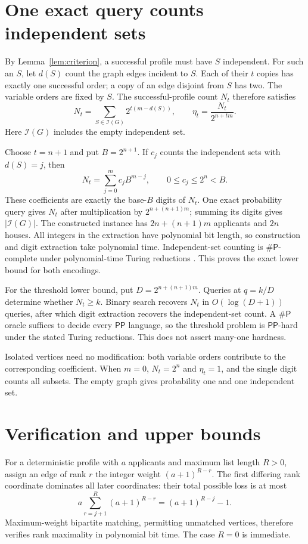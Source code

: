 \documentclass[10pt]{article}
\newcommand{\IS}{\mathcal I}
\newcommand{\PP}{\mathsf{PP}}
\newcommand{\sharpP}{\mathsf{\#P}}
\begin{document}
\section*{One exact query counts independent sets}
By Lemma~\ref{lem:criterion}, a successful profile must have $S$ independent.
For such an $S$, let $d(S)$ count the graph edges incident to $S$.
Each of their $t$ copies has exactly one successful order; a copy of
an edge disjoint from $S$ has two. The variable orders are fixed by $S$.
The successful-profile count $N_t$ therefore satisfies
\begin{equation}\label{eq:count}
 N_t=\sum_{S\in\IS(G)}2^{t(m-d(S))},
 \qquad \eta_t=\frac{N_t}{2^{n+tm}}.
\end{equation}
Here $\IS(G)$ includes the empty independent set.

Choose $t=n+1$ and put $B=2^{n+1}$. If $c_j$ counts the independent
sets with $d(S)=j$, then
\[
 N_t=\sum_{j=0}^{m}c_jB^{m-j},\qquad 0\leq c_j\leq2^n<B.
\]
These coefficients are exactly the base-$B$ digits of $N_t$.
One exact probability query gives $N_t$ after multiplication by
$2^{n+(n+1)m}$; summing its digits gives $|\IS(G)|$.
The constructed instance has $2n+(n+1)m$ applicants and $2n$ houses.
All integers in the extraction have polynomial bit length, so construction
and digit extraction take polynomial time. Independent-set counting is
$\sharpP$-complete under polynomial-time Turing reductions
\cite[\S1, problem 2; \S2, reduction 2]{provan}.
This proves the exact lower bound for both encodings.

For the threshold lower bound, put $D=2^{n+(n+1)m}$.
Queries at $q=k/D$ determine whether $N_t\geq k$. Binary search
recovers $N_t$ in $O(\log(D+1))$ queries, after which digit extraction
recovers the independent-set count. A $\sharpP$ oracle suffices to decide
every $\PP$ language, so the threshold problem is $\PP$-hard under
the stated Turing reductions. This does not assert many-one hardness.

Isolated vertices need no modification: both variable orders contribute
to the corresponding coefficient. When $m=0$, $N_t=2^n$ and $\eta_t=1$,
and the single digit counts all subsets. The empty graph gives probability
one and one independent set.

\section*{Verification and upper bounds}
For a deterministic profile with $a$ applicants and maximum list length
$R>0$, assign an edge of rank $r$ the integer weight
$(a+1)^{R-r}$. The first differing rank coordinate dominates all later
coordinates: their total possible loss is at most
\[
 a\sum_{r=j+1}^{R}(a+1)^{R-r}=(a+1)^{R-j}-1.
\]
Maximum-weight bipartite matching, permitting unmatched vertices, therefore
verifies rank maximality in polynomial bit time. The case $R=0$ is immediate.
\end{document}
